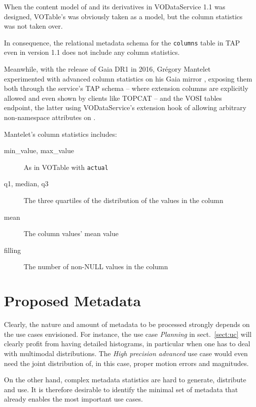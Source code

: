 \documentclass[11pt,a4paper]{ivoa}
\begin{document}
When the content model of  and its derivatives in
VODataService 1.1 \citep{2010ivoa.spec.1202P} was designed, VOTable's
 was obviously taken as a model, but the column statistics
was not taken over.

In consequence, the relational metadata schema for the
\verb|columns| table in TAP \citep{2019ivoa.spec.0927D} even in
version 1.1 does not include any column statistics.

Meanwhile, with the release of Gaia DR1 in 2016, Gr\'egory Mantelet
experimented with advanced column statistics on his Gaia mirror
\citep{data:arigaia}, exposing them both through the service's TAP
schema -- where extension columns are explicitly allowed and even shown
by clients like TOPCAT \citep{2005ASPC..347...29T} -- and the VOSI tables
endpoint, the latter using VODataService's extension hook of allowing
arbitrary non-namespace attributes on .

Mantelet's column statistics includes:

\begin{description}
\item[min\_value, max\_value] As in VOTable with  \verb|actual|
\item[q1, median, q3] The three quartiles of the distribution of the
values in the column
\item[mean] The column values' mean value
\item[filling] The number of non-NULL values in the column
\end{description}


\section{Proposed Metadata}
\label{sect:metadata}

Clearly, the nature and amount of metadata to be processed strongly
depends on the use cases envisioned.  For instance, the use case
\emph{Planning} in sect.~\ref{sect:uc} will clearly profit from having
detailed histograms, in particular when one has to deal with multimodal
distributions.  The \emph{High precision advanced} use case would even
need the joint distribution of, in this case, proper motion errors and
magnitudes.

On the other hand, complex metadata statistics are hard to generate,
distribute and use.  It is therefore desirable to identify the
minimal set of metadata that already enables the most important use
cases.
\end{document}
